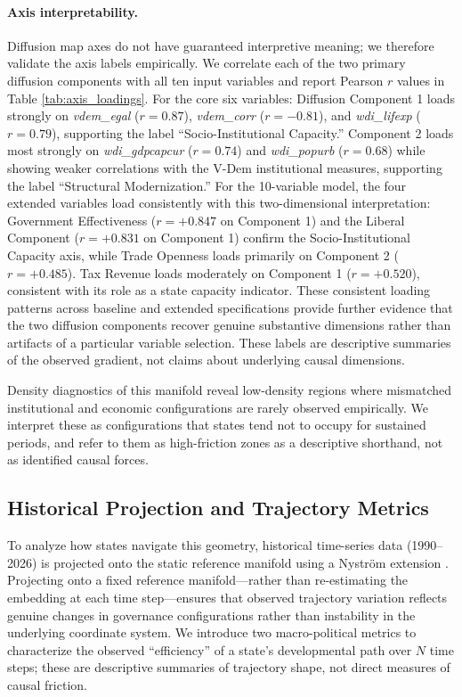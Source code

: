\documentclass[12pt]{article}
\begin{document}
\paragraph{Axis interpretability.} Diffusion map axes do not have guaranteed interpretive meaning; we therefore validate the axis labels empirically. We correlate each of the two primary diffusion components with all ten input variables and report Pearson $r$ values in Table \ref{tab:axis_loadings}. For the core six variables: Diffusion Component 1 loads strongly on \textit{vdem\_egal} ($r = 0.87$), \textit{vdem\_corr} ($r = -0.81$), and \textit{wdi\_lifexp} ($r = 0.79$), supporting the label ``Socio-Institutional Capacity.'' Component 2 loads most strongly on \textit{wdi\_gdpcapcur} ($r = 0.74$) and \textit{wdi\_popurb} ($r = 0.68$) while showing weaker correlations with the V-Dem institutional measures, supporting the label ``Structural Modernization.'' For the 10-variable model, the four extended variables load consistently with this two-dimensional interpretation: Government Effectiveness ($r = +0.847$ on Component 1) and the Liberal Component ($r = +0.831$ on Component 1) confirm the Socio-Institutional Capacity axis, while Trade Openness loads primarily on Component 2 ($r = +0.485$). Tax Revenue loads moderately on Component 1 ($r = +0.520$), consistent with its role as a state capacity indicator. These consistent loading patterns across baseline and extended specifications provide further evidence that the two diffusion components recover genuine substantive dimensions rather than artifacts of a particular variable selection. These labels are descriptive summaries of the observed gradient, not claims about underlying causal dimensions.

Density diagnostics of this manifold reveal low-density regions where mismatched institutional and economic configurations are rarely observed empirically. We interpret these as configurations that states tend not to occupy for sustained periods, and refer to them as high-friction zones as a descriptive shorthand, not as identified causal forces.

\subsection{Historical Projection and Trajectory Metrics}
To analyze how states navigate this geometry, historical time-series data (1990--2026) is projected onto the static reference manifold using a Nystr\"{o}m extension \cite{lafon2006diffusion}. Projecting onto a fixed reference manifold—rather than re-estimating the embedding at each time step—ensures that observed trajectory variation reflects genuine changes in governance configurations rather than instability in the underlying coordinate system. We introduce two macro-po\-lit\-i\-cal metrics to characterize the observed ``efficiency'' of a state's developmental path over $N$ time steps; these are descriptive summaries of trajectory shape, not direct measures of causal friction.
\end{document}
